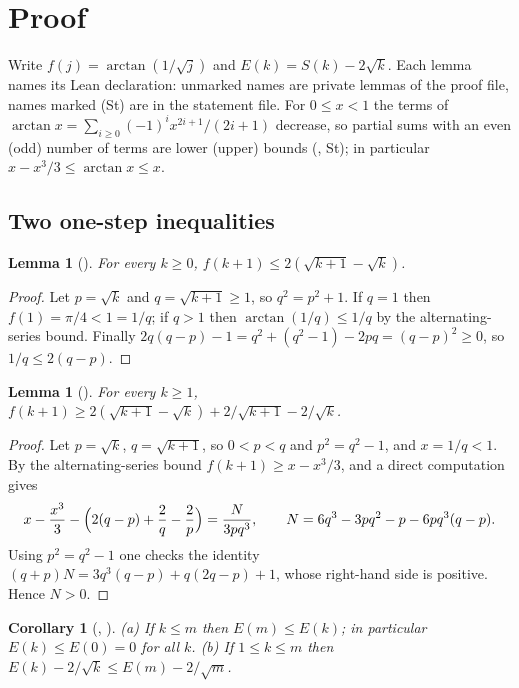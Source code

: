 \documentclass[11pt]{amsart}
\theoremstyle{plain}
\newtheorem{lemma}[theorem]{Lemma}
\newtheorem{corollary}[theorem]{Corollary}
\theoremstyle{definition}
\begin{document}
\section{Proof}\label{sec:proof}

Write $f(j)=\arctan(1/\sqrt j)$ and $E(k)=S(k)-2\sqrt k$.
Each lemma names its Lean declaration: unmarked names are private lemmas of the proof file, names marked (St) are in the statement file.
For $0\le x<1$ the terms of $\arctan x=\sum_{i\ge0}(-1)^ix^{2i+1}/(2i+1)$ decrease, so partial sums with an even (odd) number of terms are lower (upper) bounds (, St); in particular $x-x^3/3\le\arctan x\le x$.

\subsection{Two one-step inequalities}

\begin{lemma}[]\label{lem:up}
For every $k\ge0$, $f(k+1)\le2(\sqrt{k+1}-\sqrt k)$.
\end{lemma}

\begin{proof}
Let $p=\sqrt k$ and $q=\sqrt{k+1}\ge1$, so $q^2=p^2+1$.
If $q=1$ then $f(1)=\pi/4<1=1/q$; if $q>1$ then $\arctan(1/q)\le1/q$ by the alternating-series bound.
Finally $2q(q-p)-1=q^2+(q^2-1)-2pq=(q-p)^2\ge0$, so $1/q\le2(q-p)$.
\end{proof}

\begin{lemma}[]\label{lem:low}
For every $k\ge1$, $f(k+1)\ge2(\sqrt{k+1}-\sqrt k)+2/\sqrt{k+1}-2/\sqrt k$.
\end{lemma}

\begin{proof}
Let $p=\sqrt k$, $q=\sqrt{k+1}$, so $0<p<q$ and $p^2=q^2-1$, and $x=1/q<1$.
By the alternating-series bound $f(k+1)\ge x-x^3/3$, and a direct computation gives
\[
  x-\frac{x^3}3-\Bigl(2(q-p)+\frac2q-\frac2p\Bigr)=\frac{N}{3pq^3},\qquad N=6q^3-3pq^2-p-6pq^3(q-p).
\]
Using $p^2=q^2-1$ one checks the identity $(q+p)N=3q^3(q-p)+q(2q-p)+1$, whose right-hand side is positive. Hence $N>0$.
\end{proof}

\begin{corollary}[, ]\label{cor:E}
\textup{(a)} If $k\le m$ then $E(m)\le E(k)$; in particular $E(k)\le E(0)=0$ for all $k$.
\textup{(b)} If $1\le k\le m$ then $E(k)-2/\sqrt k\le E(m)-2/\sqrt m$.
\end{corollary}
\end{document}
